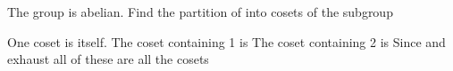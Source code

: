 \documentclass[11pt,oneside]{article}
\begin{document}
\begin{BookBody}
 The group  is abelian. Find the partition of  into cosets of the subgroup 

 One coset is  itself. The coset containing 1 is  The coset containing 2 is  Since  and  exhaust all of  these are all the cosets\BookEnd{\blacktriangle}

\end{BookBody}

\BookNarrativetrue
\end{document}

